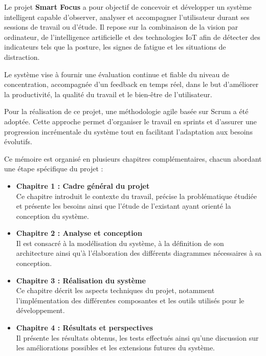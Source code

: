 \documentclass[12pt,a4paper]{report}
\begin{document}
Le projet \textbf{Smart Focus} a pour objectif de concevoir et développer un système intelligent capable d'observer, analyser et accompagner l'utilisateur durant ses sessions de travail ou d'étude. Il repose sur la combinaison de la vision par ordinateur, de l'intelligence artificielle et des technologies IoT afin de détecter des indicateurs tels que la posture, les signes de fatigue et les situations de distraction.

Le système vise à fournir une évaluation continue et fiable du niveau de concentration, accompagnée d'un feedback en temps réel, dans le but d'améliorer la productivité, la qualité du travail et le bien-être de l'utilisateur.

Pour la réalisation de ce projet, une méthodologie agile basée sur Scrum a été adoptée. Cette approche permet d'organiser le travail en sprints et d'assurer une progression incrémentale du système tout en facilitant l'adaptation aux besoins évolutifs.

Ce mémoire est organisé en plusieurs chapitres complémentaires, chacun abordant une étape spécifique du projet :

\begin{itemize}
    \item \textbf{Chapitre 1 : Cadre général du projet} \\
    Ce chapitre introduit le contexte du travail, précise la problématique étudiée et présente les besoins ainsi que l'étude de l'existant ayant orienté la conception du système.

    \item \textbf{Chapitre 2 : Analyse et conception} \\
    Il est consacré à la modélisation du système, à la définition de son architecture ainsi qu'à l'élaboration des différents diagrammes nécessaires à sa conception.

    \item \textbf{Chapitre 3 : Réalisation du système} \\
    Ce chapitre décrit les aspects techniques du projet, notamment l'implémentation des différentes composantes et les outils utilisés pour le développement.

    \item \textbf{Chapitre 4 : Résultats et perspectives} \\
    Il présente les résultats obtenus, les tests effectués ainsi qu'une discussion sur les améliorations possibles et les extensions futures du système.
\end{itemize}
\end{document}
